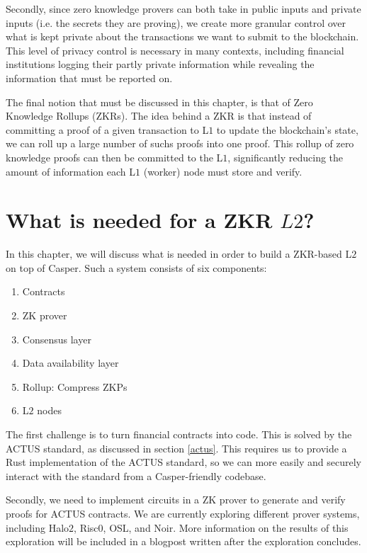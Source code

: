 \documentclass[12pt]{article}
\begin{document}
Secondly, since zero knowledge provers can both take in public inputs and
private inputs (i.e. the secrets they are proving), we create more granular
control over what is kept private about the transactions we want to submit to
the blockchain. This level of privacy control is necessary in many contexts,
including financial institutions logging their partly private information while
revealing the information that must be reported on.

The final notion that must be discussed in this chapter, is that of Zero
Knowledge Rollups (ZKRs). The idea behind a ZKR is that instead of committing a
proof of a given transaction to L$1$ to update the blockchain's state, we can
roll up a large number of suchs proofs into one proof. This rollup of zero
knowledge proofs can then be committed to the L$1$, significantly reducing the
amount of information each L$1$ (worker) node must store and verify.

\section{What is needed for a ZKR $L2$?}

In this chapter, we will discuss what is needed in order to build a ZKR-based
L$2$ on top of Casper. Such a system consists of six components:
\begin{enumerate}
  \item Contracts
  \item ZK prover
  \item Consensus layer
  \item Data availability layer
  \item Rollup: Compress ZKPs
  \item L$2$ nodes
\end{enumerate}

The first challenge is to turn financial contracts into code. This is solved by
the ACTUS standard, as discussed in section \ref{actus}. This requires us to
provide a Rust implementation of the ACTUS standard, so we can more easily and
securely interact with the standard from a Casper-friendly codebase.

Secondly, we need to implement circuits in a ZK prover to generate and verify
proofs for ACTUS contracts. We are currently exploring different prover systems,
including Halo$2$, Risc$0$, OSL, and Noir. More information on the results of
this exploration will be included in a blogpost written after the exploration
concludes.
\end{document}
